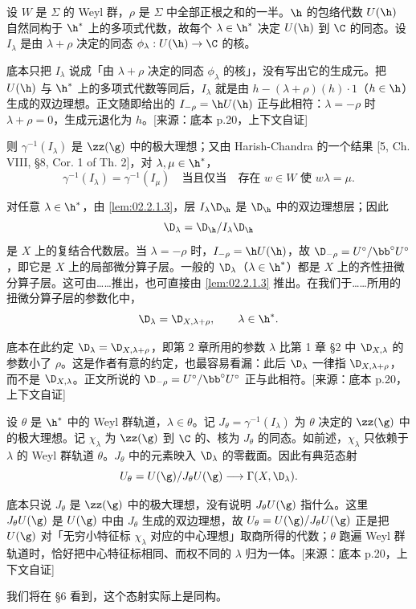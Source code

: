 设 $W$ 是 $\Sigma$ 的 Weyl 群，$\rho$ 是 $\Sigma$ 中全部正根之和的一半。$\h$ 的包络代数 $U(\h)$ 自然同构于 $\h^*$ 上的多项式代数，故每个 $\lambda\in\h^*$ 决定 $U(\h)$ 到 $\C$ 的同态。设 $I_\lambda$ 是由 $\lambda+\rho$ 决定的同态 $\phi_\lambda:U(\h)\to\C$ 的核。
\begin{annote}
底本只把 $I_\lambda$ 说成「由 $\lambda+\rho$ 决定的同态 $\phi_\lambda$ 的核」，没有写出它的生成元。把 $U(\h)$ 与 $\h^*$ 上的多项式代数等同后，$I_\lambda$ 就是由 $h-(\lambda+\rho)(h)\cdot1$（$h\in\h$）生成的双边理想。正文随即给出的 $I_{-\rho}=\h U(\h)$ 正与此相符：$\lambda=-\rho$ 时 $\lambda+\rho=0$，生成元退化为 $h$。[来源：底本 p.20，上下文自证]
\end{annote}
则 $\gamma^{-1}(I_\lambda)$ 是 $\zz(\g)$ 中的极大理想；又由 Harish-Chandra 的一个结果 [5, Ch. VIII, §8, Cor. 1 of Th. 2]，对 $\lambda,\mu\in\h^*$，
$$\gamma^{-1}(I_\lambda)=\gamma^{-1}(I_\mu)\quad\text{当且仅当}\quad \text{存在 } w\in W \text{ 使 } w\lambda=\mu.$$

对任意 $\lambda\in\h^*$，由 \ref{lem:02.2.1.3}，层 $I_\lambda\D_\h$ 是 $\D_\h$ 中的双边理想层；因此
$$\D_\lambda=\D_\h/I_\lambda\D_\h$$
是 $X$ 上的复结合代数层。当 $\lambda=-\rho$ 时，$I_{-\rho}=\h U(\h)$，故 $\D_{-\rho}=U^\circ/\bb^\circ U^\circ$，即它是 $X$ 上的局部微分算子层。一般的 $\D_\lambda$（$\lambda\in\h^*$）都是 $X$ 上的齐性扭微分算子层。这可由……推出，也可直接由 \ref{lem:02.2.1.3} 推出。在我们于……所用的扭微分算子层的参数化中，
$$\D_\lambda=\D_{X,\lambda+\rho},\qquad \lambda\in\h^*.$$
\begin{annote}
底本在此约定 $\D_\lambda=\D_{X,\lambda+\rho}$，即第 2 章所用的参数 $\lambda$ 比第 1 章 §2 中 $\D_{X,\lambda}$ 的参数小了 $\rho$。这是作者有意的约定，也最容易看漏：此后 $\D_\lambda$ 一律指 $\D_{X,\lambda+\rho}$，而不是 $\D_{X,\lambda}$。正文所说的 $\D_{-\rho}=U^\circ/\bb^\circ U^\circ$ 正与此相符。[来源：底本 p.20，上下文自证]
\end{annote}

设 $\theta$ 是 $\h^*$ 中的 Weyl 群轨道，$\lambda\in\theta$。记 $J_\theta=\gamma^{-1}(I_\lambda)$ 为 $\theta$ 决定的 $\zz(\g)$ 中的极大理想。记 $\chi_\lambda$ 为 $\zz(\g)$ 到 $\C$ 的、核为 $J_\theta$ 的同态。如前述，$\chi_\lambda$ 只依赖于 $\lambda$ 的 Weyl 群轨道 $\theta$。$J_\theta$ 中的元素映入 $\D_\lambda$ 的零截面。因此有典范态射
$$U_\theta=U(\g)/J_\theta U(\g)\longrightarrow\Gamma(X,\D_\lambda).$$
\begin{annote}
底本只说 $J_\theta$ 是 $\zz(\g)$ 中的极大理想，没有说明 $J_\theta U(\g)$ 指什么。这里 $J_\theta U(\g)$ 是 $U(\g)$ 中由 $J_\theta$ 生成的双边理想，故 $U_\theta=U(\g)/J_\theta U(\g)$ 正是把 $U(\g)$ 对「无穷小特征标 $\chi_\lambda$ 对应的中心理想」取商所得的代数；$\theta$ 跑遍 Weyl 群轨道时，恰好把中心特征标相同、而权不同的 $\lambda$ 归为一体。[来源：底本 p.20，上下文自证]
\end{annote}
我们将在 §6 看到，这个态射实际上是同构。

